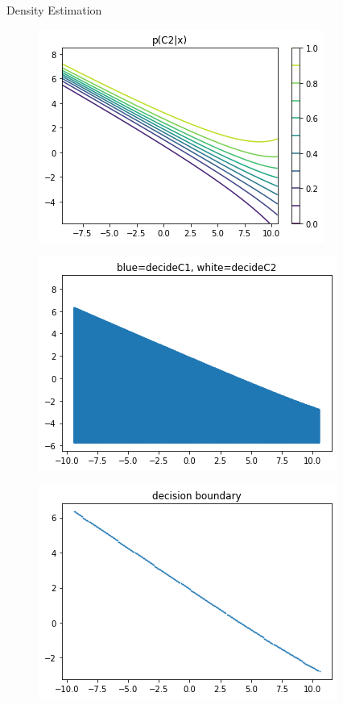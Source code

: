 \documentclass[
ngerman,
]{tudaexercise}
\begin{document}
\begin{task}{Density Estimation}
\begin{subtask}
\begin{figure}[H]
\end{figure}
\begin{figure}[H]
	\includegraphics{pc2x.png}
\end{figure}
\begin{figure}[H]
	\includegraphics{dec1.png}
\end{figure}
\begin{figure}[H]
	\includegraphics{dec2.png}
\end{figure}
	\end{subtask}
	\end{task}
	
\end{document}
